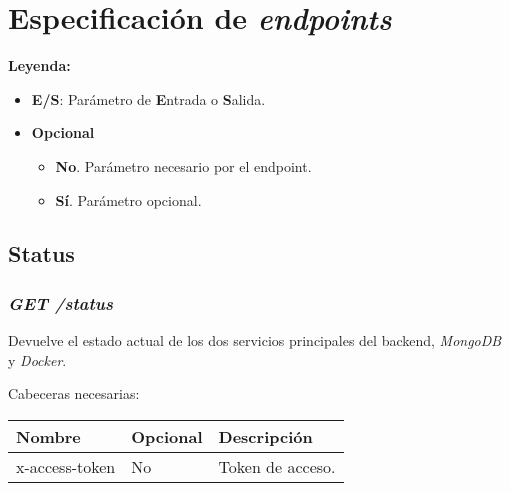 \chapter{Especificación de \textit{endpoints}}

{\Large \textbf{Leyenda:}}
\begin{itemize}
	\item \textbf{E/S}: Parámetro de \textbf{E}ntrada o \textbf{S}alida.
	
	\item \textbf{Opcional}
	\begin{itemize}
		\item \textbf{No}. Parámetro necesario por el endpoint.
		\item \textbf{Sí}. Parámetro opcional.
	\end{itemize}
\end{itemize}

\section{Status}

\subsection{\textit{GET /status}}
Devuelve el estado actual de los dos servicios principales del backend, \textit{MongoDB} y \textit{Docker}.

Cabeceras necesarias:
\begin{table}[h!]
	\centering
	\begin{tabular}{|l|l|l|}
		\hline
		Nombre & Opcional & Descripción \\ \hline
		x-access-token & No & Token de acceso. \\ \hline
	\end{tabular}
\end{table}

\bigskip

